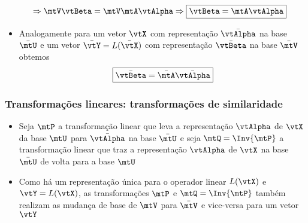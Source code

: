 \begin{frame}
\begin{itemize}
\begin{equation}
\begin{split}
        & \Rightarrow \mtV\vtBeta = \mtV\mtA\vtAlpha \Rightarrow \boxed{\vtBeta  = \mtA\vtAlpha}
      \end{split}
    \end{equation}
    \item Analogamente para um vetor $\vtX$ com representação $\bar{\vtAlpha}$ na base $\bar{\mtU}$ e um vetor $\bar{\vtY} = L(\bar{\vtX})$ com representação $\bar{\vtBeta}$ na base $\bar{\mtV}$ obtemos
    \begin{equation}\label{eq_betabar_rep}
      \boxed{\bar{\vtBeta}  = \bar{\mtA}\bar{\vtAlpha}}
    \end{equation}
  \end{itemize}
\end{frame}

\begin{frame}
  \frametitle{Transformações lineares: transformações de similaridade}
  \begin{itemize}\small
    \item Seja $\mtP$ a transformação linear que leva a representação $\vtAlpha$ de $\vtX$ da base $\mtU$ para $\bar{\vtAlpha}$ na base $\bar{\mtU}$ e seja $\mtQ = \Inv{\mtP}$ a transformação linear que traz a representação $\vtAlpha$ de $\vtX$ na base $\bar{\mtU}$ de volta para a base $\mtU$
    \item Como há um representação única para o operador linear $L(\vtX)$ e $\vtY = L(\vtX)$, as transformações $\mtP$ e $\mtQ = \Inv{\mtP}$ também realizam as mudança de base de $\mtV$ para $\bar{\mtV}$ e vice-versa para um vetor $\vtY$
  \end{itemize}
  \vspace{-\baselineskip}
  \begin{columns}[t]
    \begin{column}{0.48\linewidth}
  \begin{center}
\end{center}
\end{column}
\end{columns}
\end{frame}
